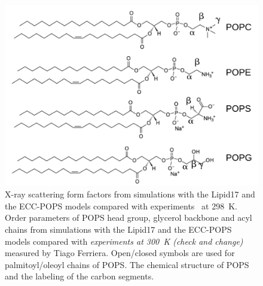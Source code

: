 \begin{figure}[tb!]
  \includegraphics[width=\figwidth]{../img/ecc_pops/lipids_chemfig.pdf} 
  \caption{\label{simVSexpNOions} 
    X-ray scattering form factors from simulations with the Lipid17 \cite{lipid17-future} and 
    the ECC-POPS \citep{melcr18} models compared with experiments~\cite{SDP-CHARMM36_comparison_paper_Samuli-knows} at 298~K. 
    Order parameters of POPS head group, glycerol backbone and acyl chains  
    from simulations with the Lipid17 \cite{lipid17-future} and the ECC-POPS models 
    compared with \emph{experiments at 300~K (check and change)} measured by Tiago Ferriera. 
    Open/closed symbols are used for palmitoyl/oleoyl chains of POPS. 
    The chemical structure of POPS and the labeling of the carbon segments. 
  }  
\end{figure} 
 

